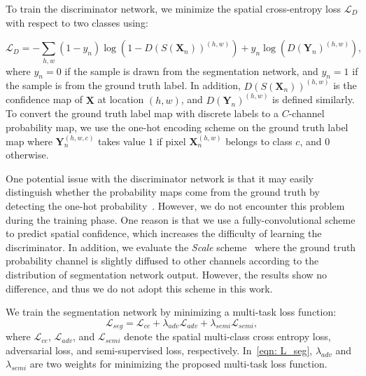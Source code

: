 \documentclass{bmvc2k}
\begin{document}
	\vspace{-2mm}{\flushleft \bf Discriminator network.}
	To train the discriminator network, we minimize the spatial cross-entropy loss $\mathcal{L}_{D}$ with respect to two classes using:
	
	
	\begin{equation}
		\label{eqn: L_D}
		\mathcal{L}_{D} = - \sum_{h,w}{} (1-y_n) \log(1-D(S(\mathbf{X}_n))^{(h,w)}) + y_n \log(D(\mathbf{Y}_n)^{(h,w)}),
	\end{equation}
	where $y_n = 0$ if the sample is drawn from the segmentation network, and $y_n = 1$ if the sample is from the ground truth label.
	In addition, $D(S(\mathbf{X}_n))^{(h,w)}$ is the confidence map of $\mathbf{X}$ 
	at location $(h, w)$, and $D(\mathbf{Y}_n)^{(h, w)}$ is defined similarly.
	To convert the ground truth label map with discrete labels to a $C$-channel probability map, we use the one-hot encoding scheme on the ground truth label map where $\mathbf{Y}_n^{(h,w,c)}$ takes value $1$ if pixel $\mathbf{X}_n^{(h,w)}$ belongs to class $c$, and $0$ otherwise.
	
	One potential issue with the discriminator network is that it may easily distinguish whether the probability maps come from the ground truth by detecting the one-hot probability~\cite{luc2016semantic}. 
	However, we do not encounter this problem during the training phase.
	One reason is that we use a fully-convolutional scheme to predict spatial confidence, which increases the difficulty of learning the discriminator.
	In addition, we evaluate the \textit{Scale} scheme~\cite{luc2016semantic} 
	where the ground truth probability channel is slightly diffused to other channels according to the distribution of segmentation network output. 
	However, the results show no difference, and thus we do not adopt this scheme in this work.
	
	\vspace{-2mm}{\flushleft \bf Segmentation network.}
	We train the segmentation network by minimizing a multi-task loss function:
	\begin{equation}
		\label{eqn: L_seg}
		\mathcal{L}_{seg} = \mathcal{L}_{ce} + \lambda_{adv} \mathcal{L}_{adv} +  \lambda_{semi} \mathcal{L}_{semi},
	\end{equation}
	where $\mathcal{L}_{ce}$, $\mathcal{L}_{adv}$, and $\mathcal{L}_{semi}$ denote the spatial multi-class cross entropy loss, adversarial loss, and semi-supervised loss, respectively.
	In~\eqref{eqn: L_seg}, $\lambda_{adv}$ and $\lambda_{semi}$ are two weights 
	for minimizing the proposed multi-task loss function.
	
\end{document}
